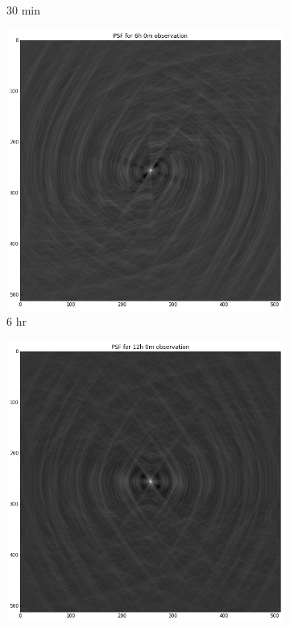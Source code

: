 \begin{figure}[h]
\begin{mdframed}
\begin{subfigure}[b]{0.24\textwidth}
  \caption{30 min}
 \end{subfigure}
 \begin{subfigure}[b]{0.24\textwidth}
  \includegraphics[width=\textwidth]{images/evla_observation_psf/6hr.png}
  \caption{6 hr}
 \end{subfigure}
 \begin{subfigure}[b]{0.24\textwidth}
  \includegraphics[width=\textwidth]{images/evla_observation_psf/12hr.png}

\end{subfigure}
\end{mdframed}
\end{figure}
